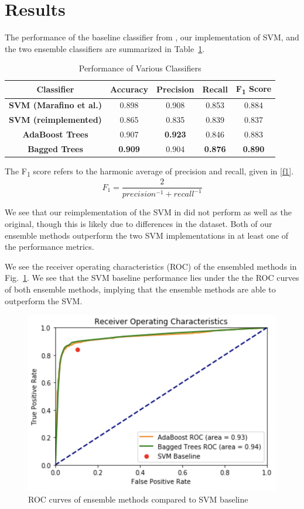 \documentclass[conference]{IEEEtran}
\begin{document}
\section{Results}
The performance of the baseline classifier from \cite{Marafino}, our implementation of SVM, and the two ensemble classifiers are summarized in Table~\ref{restab}.
\begin{table}[htbp]
\caption{Performance of Various Classifiers}
\begin{center}
\begin{tabular}{ccccc}
\textbf{Classifier}&\textbf{Accuracy}&\textbf{Precision}&\textbf{Recall}&\textbf{F\textsubscript{1} Score} \\
\hline
\textbf{SVM (Marafino et al.)} & 0.898 & 0.908 & 0.853 & 0.884 \\
\textbf{SVM (reimplemented)} & 0.865 & 0.835 & 0.839 & 0.837 \\
\textbf{AdaBoost Trees} & 0.907 & \textbf{0.923} & 0.846 & 0.883 \\
\textbf{Bagged Trees} & \textbf{0.909} & 0.904 & \textbf{0.876} & \textbf{0.890} \\
\end{tabular}
\label{restab}
\end{center}
\end{table}
The F\textsubscript{1} score refers to the harmonic average of precision and recall, given in \eqref{f1}.
\begin{equation}
F_1 = \frac{2}{precision^{-1} + recall^{-1}}\label{f1}
\end{equation}

We see that our reimplementation of the SVM in \cite{MARAFINO} did not perform as well as the original, though this is likely due to differences in the dataset. Both of our ensemble methods outperform the two SVM implementations in at least one of the performance metrics. 

We see the receiver operating characteristics (ROC) of the ensembled methods in Fig.~\ref{roc}. We see that the SVM baseline performance lies under the the ROC curves of both ensemble methods, implying that the ensemble methods are able to outperform the SVM. 
\begin{figure}[htbp]
\centerline{\includegraphics[scale=0.6]{roc}}
\caption{ROC curves of ensemble methods compared to SVM baseline}
\label{roc}
\end{figure}
\end{document}
